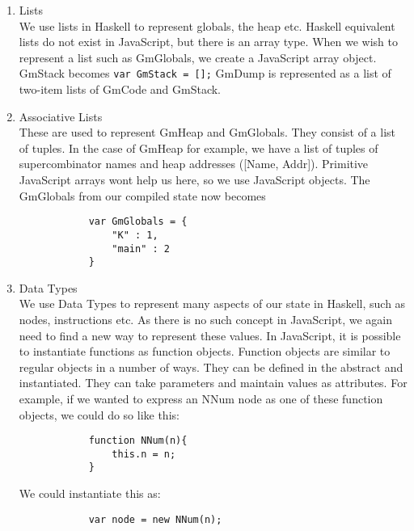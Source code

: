 \begin{enumerate}
    \item Lists\\
          We use lists in Haskell to represent globals, the
          heap etc. Haskell equivalent lists do not exist
          in JavaScript, but there is an array type. When 
          we wish to represent a list such as GmGlobals, we
          create a JavaScript array object. GmStack becomes
          \verb!var GmStack = [];!
          GmDump is represented as a list of two-item lists 
          of GmCode and GmStack.
    \item Associative Lists\\
          These are used to represent GmHeap and GmGlobals.
          They consist of a list of tuples. In the case of
          GmHeap for example, we have a list of tuples of
          supercombinator names and heap addresses ([Name,
          Addr]). Primitive JavaScript arrays wont help
          us here, so we use JavaScript objects. The 
          GmGlobals from our compiled state now becomes 

          \begin{verbatim}
            var GmGlobals = {
                "K" : 1,
                "main" : 2
            }
          \end{verbatim}

    \item Data Types \\
          We use Data Types to represent many aspects of 
          our state in Haskell, such as nodes, instructions
          etc. As there is no such concept in JavaScript, 
          we again need to find a new way to represent these
          values. In JavaScript, it is possible to instantiate
          functions as function objects. Function objects are
          similar to regular objects in a number of ways. They
          can be defined in the abstract and instantiated. They
          can take parameters and maintain values as attributes.
          For example, if we wanted to express an NNum node as
          one of these function objects, we could do so like
          this:

          \begin{verbatim}
            function NNum(n){
                this.n = n;
            }
          \end{verbatim}

          We could instantiate this as:

          \begin{verbatim}
            var node = new NNum(n);
          \end{verbatim}


\end{enumerate}
